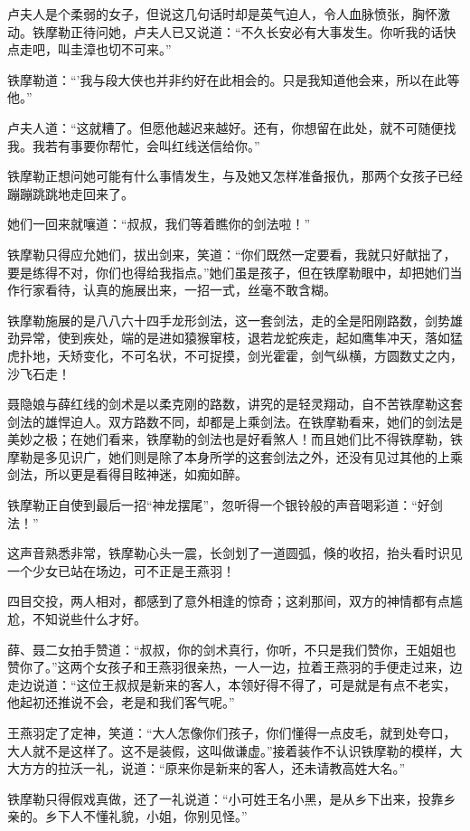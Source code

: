 \documentclass[12pt,oneside]{book}
\begin{document}
卢夫人是个柔弱的女子，但说这几句话时却是英气迫人，令人血脉愤张，胸怀激动。铁摩勒正待问她，卢夫人已又说道：``不久长安必有大事发生。你听我的话快点走吧，叫圭漳也切不可来。''

铁摩勒道：``'我与段大侠也并非约好在此相会的。只是我知道他会来，所以在此等他。''

卢夫人道：``这就糟了。但愿他越迟来越好。还有，你想留在此处，就不可随便找我。我若有事要你帮忙，会叫红线送信给你。''

铁摩勒正想问她可能有什么事情发生，与及她又怎样准备报仇，那两个女孩子已经蹦蹦跳跳地走回来了。

她们一回来就嚷道：``叔叔，我们等着瞧你的剑法啦！''

铁摩勒只得应允她们，拔出剑来，笑道：``你们既然一定要看，我就只好献拙了，要是练得不对，你们也得给我指点。''她们虽是孩子，但在铁摩勒眼中，却把她们当作行家看待，认真的施展出来，一招一式，丝毫不敢含糊。

铁摩勒施展的是八八六十四手龙形剑法，这一套剑法，走的全是阳刚路数，剑势雄劲异常，使到疾处，端的是进如猿猴窜枝，退若龙蛇疾走，起如鹰隼冲天，落如猛虎扑地，夭矫变化，不可名状，不可捉摸，剑光霍霍，剑气纵横，方圆数丈之内，沙飞石走！

聂隐娘与薛红线的剑术是以柔克刚的路数，讲究的是轻灵翔动，自不苦铁摩勒这套剑法的雄悍迫人。双方路数不同，却都是上乘剑法。在铁摩勒看来，她们的剑法是美妙之极；在她们看来，铁摩勒的剑法也是好看煞人！而且她们比不得铁摩勒，铁摩勒是多见识广，她们则是除了本身所学的这套剑法之外，还没有见过其他的上乘剑法，所以更是看得目眩神迷，如痴如醉。

铁摩勒正自使到最后一招``神龙摆尾''，忽听得一个银铃般的声音喝彩道：``好剑法！''

这声音熟悉非常，铁摩勒心头一震，长剑划了一道圆弧，倏的收招，抬头看时识见一个少女已站在场边，可不正是王燕羽！

四目交投，两人相对，都感到了意外相逢的惊奇；这刹那间，双方的神情都有点尴尬，不知说些什么才好。

薛、聂二女拍手赞道：``叔叔，你的剑术真行，你听，不只是我们赞你，王姐姐也赞你了。''这两个女孩子和王燕羽很亲热，一人一边，拉着王燕羽的手便走过来，边走边说道：``这位王叔叔是新来的客人，本领好得不得了，可是就是有点不老实，他起初还推说不会，老是和我们客气呢。''

王燕羽定了定神，笑道：``大人怎像你们孩子，你们懂得一点皮毛，就到处夸口，大人就不是这样了。这不是装假，这叫做谦虚。''接着装作不认识铁摩勒的模样，大大方方的拉沃一礼，说道：``原来你是新来的客人，还未请教高姓大名。''

铁摩勒只得假戏真做，还了一礼说道：``小可姓王名小黑，是从乡下出来，投靠乡亲的。乡下人不懂礼貌，小姐，你别见怪。''
\end{document}
